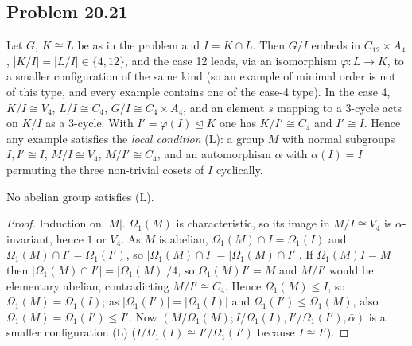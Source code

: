 \subsection{Problem 20.21}\label{app:2021}
Let $G$, $K\cong L$ be as in the problem and $I=K\cap L$. Then $G/I$ embeds in $C_{12}\times A_4$, $|K/I|=|L/I|\in
\{4,12\}$, and the case 12 leads, via an isomorphism $\varphi:L\to K$, to a smaller configuration of the same kind
(so an example of minimal order is not of this type, and every example contains one of the case-4 type). In the case 4, $K/I\cong V_4$, $L/I\cong C_4$, $G/I\cong C_4\times A_4$,
and an element $s$ mapping to a 3-cycle acts on $K/I$ as a 3-cycle. With $I'=\varphi(I)\trianglelefteq K$ one has
$K/I'\cong C_4$ and $I'\cong I$. Hence any example satisfies the \emph{local condition} (L): a group $M$ with
normal subgroups $I,I'\cong I$, $M/I\cong V_4$, $M/I'\cong C_4$, and an automorphism $\alpha$ with $\alpha(I)=I$
permuting the three non-trivial cosets of $I$ cyclically.

\begin{lemma}\label{lem:2021ab}
No abelian group satisfies (L).
\end{lemma}
\begin{proof}
Induction on $|M|$. $\Omega_1(M)$ is characteristic, so its image in $M/I\cong V_4$ is $\alpha$-invariant, hence $1$
or $V_4$. As $M$ is abelian, $\Omega_1(M)\cap I=\Omega_1(I)$ and $\Omega_1(M)\cap I'=\Omega_1(I')$, so
$|\Omega_1(M)\cap I|=|\Omega_1(M)\cap I'|$. If $\Omega_1(M)I=M$ then $|\Omega_1(M)\cap I'|=|\Omega_1(M)|/4$, so
$\Omega_1(M)I'=M$ and $M/I'$ would be elementary abelian, contradicting $M/I'\cong C_4$. Hence $\Omega_1(M)\le I$, so $\Omega_1(M)=\Omega_1(I)$; as $|\Omega_1(I')|=|\Omega_1(I)|$ and
$\Omega_1(I')\le\Omega_1(M)$, also $\Omega_1(M)=\Omega_1(I')\le I'$. Now $(M/\Omega_1(M);I/\Omega_1(I),I'/\Omega_1(I'),\bar\alpha)$ is a smaller configuration
(L) ($I/\Omega_1(I)\cong I'/\Omega_1(I')$ because $I\cong I'$).
\end{proof}

